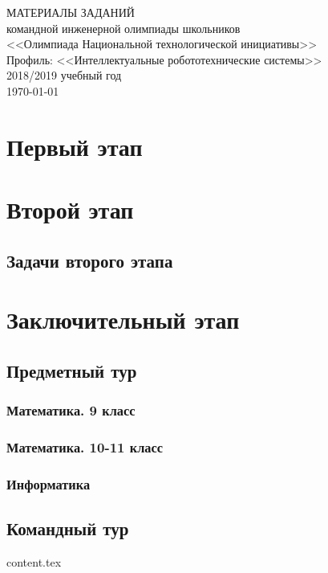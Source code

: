 \documentclass[a4paper,12pt,oneside]{book}
\begin{document}
\begin{titlepage}
    \begin{center}
        \huge{МАТЕРИАЛЫ ЗАДАНИЙ} \\
        \Large{командной инженерной олимпиады школьников} \\
        \Large{<<Олимпиада Национальной технологической инициативы>>} \\
        \Large{Профиль: <<Интеллектуальные робототехнические системы>>} \\
        \large{2018/2019 учебный год} \\
        \vspace{2cm}
        \Large{\today}  
    \end{center}
\end{titlepage}

\setcounter{tocdepth}{1}

\tableofcontents

\part{Первый этап}




\part{Второй этап}
\clearpage
\chapter{Задачи второго этапа}



\part{Заключительный этап}

\clearpage
\chapter{Предметный тур}

\section{Математика. 9 класс}


\section{Математика. 10-11 класс}


\section{Информатика}


\chapter{Командный тур}

{content.tex}
\end{document}
